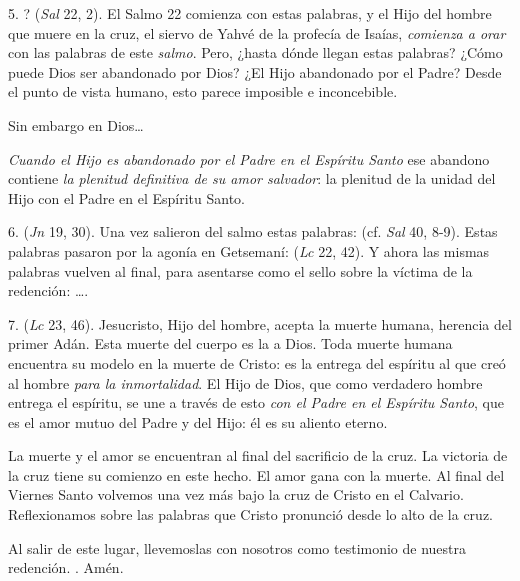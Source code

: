 \begin{body}
5. ? (\textit{Sal} 22, 2). El Salmo 22 comienza con estas palabras, y el Hijo del hombre que muere en la cruz, el siervo de Yahvé de la profecía de Isaías, \textit{comienza a orar} con las palabras de este \textit{salmo}. Pero, ¿hasta dónde llegan estas palabras? ¿Cómo puede Dios ser abandonado por Dios? ¿El Hijo abandonado por el Padre? Desde el punto de vista humano, esto parece imposible e inconcebible. 

Sin embargo en Dios\ldots 

\textit{Cuando el Hijo es abandonado por el Padre en el Espíritu Santo} ese abandono contiene \textit{la plenitud definitiva de su amor salvador}: la plenitud de la unidad del Hijo con el Padre en el Espíritu Santo. 

6.  (\textit{Jn} 19, 30). Una vez salieron del salmo estas palabras:  (cf. \textit{Sal} 40, 8-9). Estas palabras pasaron por la agonía en Getsemaní: (\textit{Lc} 22, 42). Y ahora las mismas palabras vuelven al final, para asentarse como el sello sobre la víctima de la redención: \ldots {}. 

7.  (\textit{Lc} 23, 46). Jesucristo, Hijo del hombre, acepta la muerte humana, herencia del primer Adán. Esta muerte del cuerpo es la  a Dios. Toda muerte humana encuentra su modelo en la muerte de Cristo: es la entrega del espíritu al que creó al hombre \textit{para la inmortalidad}. El Hijo de Dios, que como verdadero hombre entrega el espíritu, se une a través de esto \textit{con el Padre en el Espíritu Santo}, que es el amor mutuo del Padre y del Hijo: él es su aliento eterno. 

La muerte y el amor se encuentran al final del sacrificio de la cruz. La victoria de la cruz tiene su comienzo en este hecho. El amor gana con la muerte. Al final del Viernes Santo volvemos una vez más bajo la cruz de Cristo en el Calvario. Reflexionamos sobre las palabras que Cristo pronunció desde lo alto de la cruz. 

Al salir de este lugar, llevemoslas con nosotros como testimonio de nuestra redención. . Amén.

\end{body}


